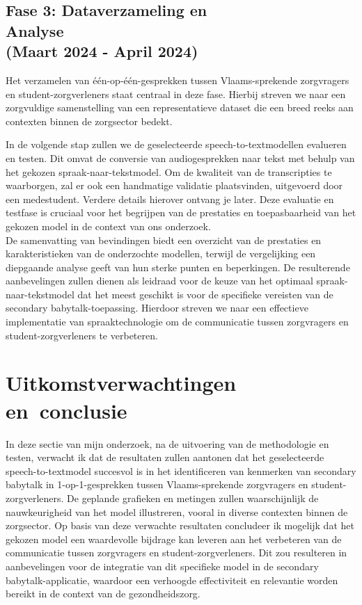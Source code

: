 \subsection{Fase 3: Dataverzameling en \\ Analyse \\ (Maart 2024 - April 2024)}
Het verzamelen van één-op-één-gesprekken tussen Vlaams-sprekende zorgvragers en student-zorgverleners staat centraal in deze fase. Hierbij streven we naar een zorgvuldige samenstelling van een representatieve dataset die een breed reeks aan contexten binnen de zorgsector bedekt.

In de volgende stap zullen we de geselecteerde speech-to-textmodellen evalueren en testen. Dit omvat de conversie van audiogesprekken naar tekst met behulp van het gekozen spraak-naar-tekstmodel. Om de kwaliteit van de transcripties te waarborgen, zal er ook een handmatige validatie plaatsvinden, uitgevoerd door een medestudent. Verdere details hierover ontvang je later. Deze evaluatie en testfase is cruciaal voor het begrijpen van de prestaties en toepasbaarheid van het gekozen model in de context van ons onderzoek.\\
De samenvatting van bevindingen biedt een overzicht van de prestaties en karakteristieken van de onderzochte modellen, terwijl de vergelijking een diepgaande analyse geeft van hun sterke punten en beperkingen. De resulterende aanbevelingen zullen dienen als leidraad voor de keuze van het optimaal spraak-naar-tekstmodel dat het meest geschikt is voor de specifieke vereisten van de secondary babytalk-toepassing. Hierdoor streven we naar een effectieve implementatie van spraaktechnologie om de communicatie tussen zorgvragers en student-zorgverleners te verbeteren.
\section{Uitkomstverwachtingen \\ en conclusie}%
\label{sec:verwachte_resultaten}
In deze sectie van mijn onderzoek, na de uitvoering van de methodologie en testen, verwacht ik dat de resultaten zullen aantonen dat het geselecteerde speech-to-textmodel succesvol is in het identificeren van kenmerken van secondary babytalk in 1-op-1-gesprekken tussen Vlaams-sprekende zorgvragers en student-zorgverleners. De geplande grafieken en metingen zullen waarschijnlijk de nauwkeurigheid van het model illustreren, vooral in diverse contexten binnen de zorgsector. Op basis van deze verwachte resultaten concludeer ik mogelijk dat het gekozen model een waardevolle bijdrage kan leveren aan het verbeteren van de communicatie tussen zorgvragers en student-zorgverleners. Dit zou resulteren in aanbevelingen voor de integratie van dit specifieke model in de secondary babytalk-applicatie, waardoor een verhoogde effectiviteit en relevantie worden bereikt in de context van de gezondheidszorg.

